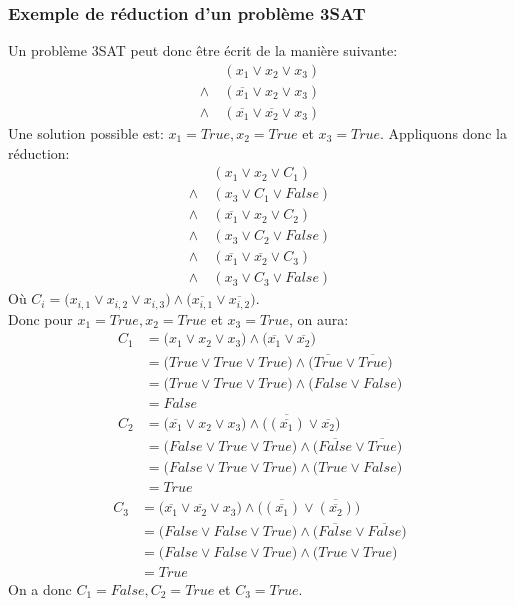 \documentclass[a4paper,11pt]{article}
\begin{document}
    \subsubsection{Exemple de réduction d'un problème 3SAT}
      Un problème 3SAT peut donc être écrit de la manière suivante:
      \begin{align*}
	&(x_1 \vee x_2 \vee x_3)\\
	\wedge\ &(\overline{x_1} \vee x_2 \vee x_3)\\
	\wedge\ &(\overline{x_1} \vee \overline{x_2} \vee x_3)
      \end{align*}
      Une solution possible est: $x_1 = True, x_2 = True$ et $x_3 = True$.  Appliquons donc la réduction:
      \begin{align*}
	&(x_1 \vee x_2 \vee C_1)\\
	\wedge\ &(x_3 \vee C_1 \vee False)\\
	\wedge\ &(\overline{x_1} \vee x_2 \vee C_2)\\
	\wedge\ &(x_3 \vee C_2 \vee False)\\
	\wedge\ &(\overline{x_1} \vee \overline{x_2} \vee C_3)\\
	\wedge\ &(x_3 \vee C_3 \vee False)
      \end{align*}
      Où $C_i = \big(x_{i, 1} \vee x_{i, 2} \vee x_{i, 3}\big) \wedge \big(\overline{x_{i, 1}} \vee \overline{x_{i, 2}}\big)$.\\
      Donc pour $x_1 = True, x_2 = True$ et $x_3 = True$, on aura:
      \begin{align*}
	C_1 &= \big(x_1 \vee x_2 \vee x_3\big) \wedge \big(\overline{x_1} \vee \overline{x_2}\big)\\
	&= \big(True \vee True \vee True\big) \wedge \big(\overline{True} \vee \overline{True}\big)\\
	&= \big(True \vee True \vee True\big) \wedge \big(False \vee False\big)\\
	&= False
      \end{align*}
      \begin{align*}
	C_2 &= \big(\overline{x_1} \vee x_2 \vee x_3\big) \wedge \big(\overline{(\overline{x_1})} \vee \overline{x_2}\big)\\
	&= \big(False \vee True \vee True\big) \wedge \big(\overline{False} \vee \overline{True}\big)\\
	&= \big(False \vee True \vee True\big) \wedge \big(True \vee False\big)\\
	&= True
      \end{align*}
      \begin{align*}
	C_3 &= \big(\overline{x_1} \vee \overline{x_2} \vee x_3\big) \wedge \big(\overline{(\overline{x_1})} \vee \overline{(\overline{x_2})}\big)\\
	&= \big(False \vee False \vee True\big) \wedge \big(\overline{False} \vee \overline{False}\big)\\
	&= \big(False \vee False \vee True\big) \wedge \big(True \vee True\big)\\
	&= True
      \end{align*}
      On a donc $C_1 = False, C_2 = True$ et $C_3 = True$.\\
      
\end{document}
